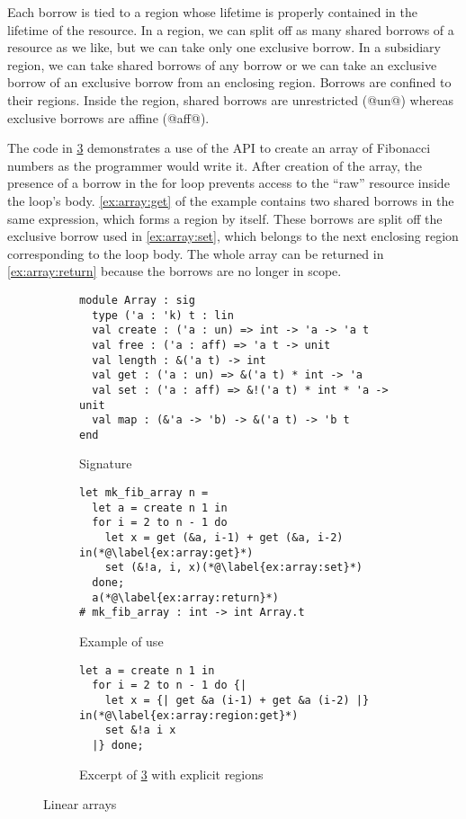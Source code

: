 Each borrow is tied to a region whose lifetime is properly
contained in the lifetime of the resource.
In a region, we can split off as many shared borrows of a resource as
we like, but we can take only one exclusive borrow. In a 
subsidiary region, we can take shared borrows of any
borrow or we can take an exclusive borrow of an exclusive borrow from an
enclosing region. Borrows are confined to their regions. Inside the region,
shared borrows are unrestricted (@un@) whereas exclusive
borrows are affine (@aff@).

The code in \cref{ex:array} demonstrates a use of the API to create an
array of Fibonacci numbers as the programmer would write it. After
creation of the array, the presence of a borrow in the for loop
prevents access to the ``raw'' resource inside the loop's
body. \cref{ex:array:get} of the example contains two shared borrows
in the same expression, which forms a region by itself. These borrows
are split off the exclusive borrow used in \cref{ex:array:set}, which
belongs to the next enclosing region corresponding to the loop body.
The whole array can be returned in \cref{ex:array:return} because  the
borrows are no longer in scope. 

\begin{figure}[tp]
  \centering
  \begin{subfigure}[t]{1\linewidth}
\begin{lstlisting}
module Array : sig
  type ('a : 'k) t : lin
  val create : ('a : un) => int -> 'a -> 'a t
  val free : ('a : aff) => 'a t -> unit
  val length : &('a t) -> int
  val get : ('a : un) => &('a t) * int -> 'a
  val set : ('a : aff) => &!('a t) * int * 'a -> unit
  val map : (&'a -> 'b) -> &('a t) -> 'b t
end
\end{lstlisting}
    \vspace{-15pt}
    \caption{Signature}
    \label{sig:array}
  \end{subfigure}

  \begin{subfigure}[t]{1\linewidth}
\begin{lstlisting}
let mk_fib_array n =
  let a = create n 1 in
  for i = 2 to n - 1 do
    let x = get (&a, i-1) + get (&a, i-2) in(*@\label{ex:array:get}*)
    set (&!a, i, x)(*@\label{ex:array:set}*)
  done;
  a(*@\label{ex:array:return}*)
# mk_fib_array : int -> int Array.t
\end{lstlisting}
    \vspace{-10pt}
    \caption{Example of use}
    \label{ex:array}
\begin{lstlisting}[firstnumber=2]
  let a = create n 1 in
  for i = 2 to n - 1 do {|
    let x = {| get &a (i-1) + get &a (i-2) |} in(*@\label{ex:array:region:get}*)
    set &!a i x
  |} done;
\end{lstlisting}
    \vspace{-10pt}
    \caption{Excerpt of \cref{ex:array} with explicit regions}
    \label{ex:array:region}
  \end{subfigure}
  \vspace{-5pt}
  \caption{Linear arrays}
  \label{ex:array}
\end{figure}

